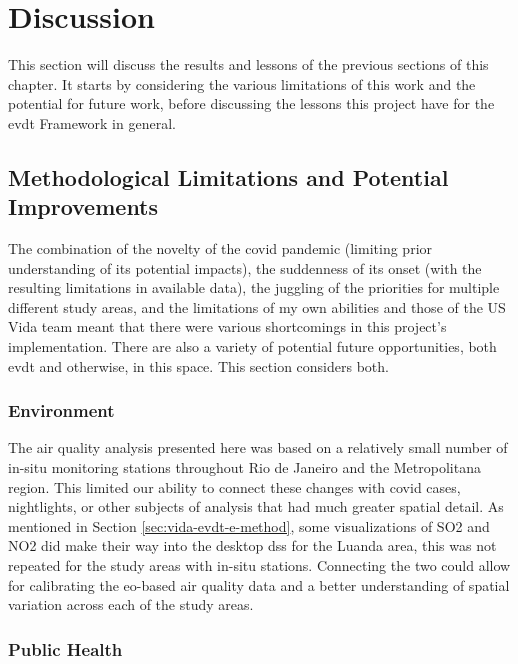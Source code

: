 \section{Discussion} \label{sec:vida-discuss}

This section will discuss the results and lessons of the previous sections of this chapter. It starts by considering the various limitations of this work and the potential for future work, before discussing the lessons this project have for the \ac{evdt} Framework in general.

\subsection{Methodological Limitations and Potential Improvements}

The combination of the novelty of the \ac{covid} pandemic (limiting prior understanding of its potential impacts), the suddenness of its onset (with the resulting limitations in available data), the juggling of the priorities for multiple different study areas, and the limitations of my own abilities and those of the US Vida team meant that there were various shortcomings in this project's implementation. There are also a variety of potential future opportunities, both \ac{evdt} and otherwise, in this space. This section considers both.


\subsubsection{Environment}

The air quality analysis presented here was based on a relatively small number of in-situ monitoring stations throughout Rio de Janeiro and the Metropolitana region. This limited our ability to connect these changes with \ac{covid} cases, nightlights, or other subjects of analysis that had much greater spatial detail. As mentioned in Section \ref{sec:vida-evdt-e-method}, some visualizations of SO2 and NO2 did make their way into the desktop \ac{dss} for the Luanda area, this was not repeated for the study areas with in-situ stations. Connecting the two could allow for calibrating the \ac{eo}-based air quality data and a better understanding of spatial variation across each of the study areas.

\subsubsection{Public Health}

